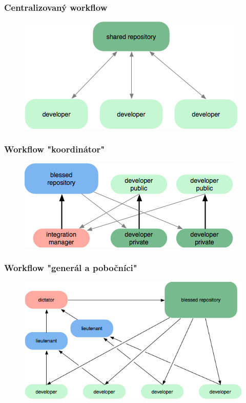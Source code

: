 \documentclass[red]{beamer}
\begin{document}
\begin{frame}
  \frametitle{Centralizovaný workflow}

  \begin{figure}
  \centering
  \includegraphics[scale=1]{git-pics/workflow-a.png}
\end{figure}
\end{frame}

\begin{frame}
  \frametitle{Workflow "koordinátor"}

  \begin{figure}
  \centering
  \includegraphics[scale=1]{git-pics/workflow-b.png}
\end{figure}
\end{frame}

\begin{frame}
  \frametitle{Workflow "generál a pobočníci"}

  \begin{figure}
  \centering
  \includegraphics[scale=1]{git-pics/workflow-c.png}
\end{figure}
\end{frame}
	
\end{document}
